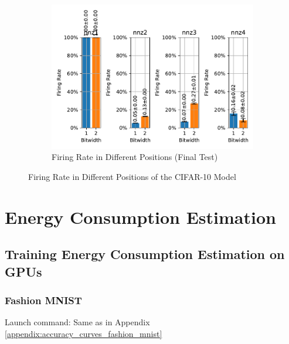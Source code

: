         \begin{figure}[H]
            \centering
            \ContinuedFloat
            \begin{subfigure}[H]{\textwidth}
                \centering
                \includegraphics[width=\textwidth]{../firerate/CIFAR10/plots/cifar10_final_firerate.pdf}
                \caption{Firing Rate in Different Positions (Final Test)}
            \end{subfigure}
            \caption{Firing Rate in Different Positions of the CIFAR-10 Model}
        \end{figure}

\chapter{Energy Consumption Estimation}
\label{appendix:energy}

\section{Training Energy Consumption Estimation on GPUs}
\label{appendix:energy_gpu}

    \subsection{Fashion MNIST}
    \label{appendix:energy_gpu_fashion_mnist}
        Launch command: Same as in Appendix \ref{appendix:accuracy_curves_fashion_mnist}

